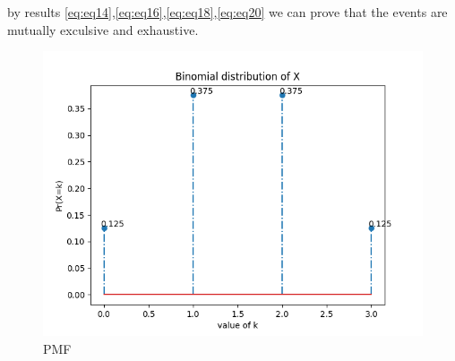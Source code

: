 \documentclass[journal,12pt,twocolumn]{IEEEtran}
\begin{document}
	by results \eqref{eq:eq14},\eqref{eq:eq16},\eqref{eq:eq18},\eqref{eq:eq20}
	we can prove that the events are mutually exculsive and exhaustive.
	\begin{figure}[h!]
		\centering
		\includegraphics[width=\columnwidth]{./figs/binomial.png}
		\caption{PMF}
		\label{Fig 0:}
	\end{figure}
\end{document}
